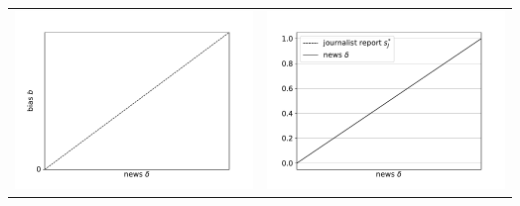 \documentclass{article}
\begin{document}
\begin{tabular}{cc}
	\includegraphics[scale=.5]{news_bias} & \includegraphics[scale=.5]{news_journalist_report_news} \\
\end{tabular}
\pagebreak
\end{document}
